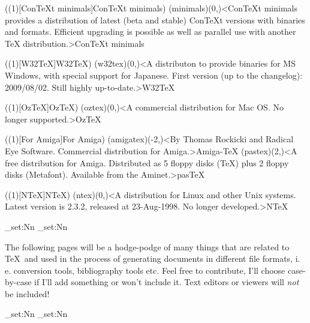 \tograph(\tostruct(1)[Con\TeX t minimals]{Con\TeX t minimals}){
	\tonode(minimals)(0,\layer)<ConTeXt minimals provides a distribution of latest (beta and stable) ConTeXt versions with binaries and formats. Efficient upgrading is possible as well as parallel use with another TeX distribution.>{Con\TeX t minimals}
}

\tograph(\tostruct(1)[W32\TeX]{W32\TeX}){
	\tonode(w32tex)(0,\layer)<A distributon to provide binaries for MS Windows, with special support for Japanese. First version (up to the changelog): 2009/08/02. Still highly up-to-date.>{W32\TeX}
}

\tograph(\tostruct(1)[OzTeX]{OzTeX}){
	\tonode[\histdistro](oztex)(0,\layer)<A commercial distribution for Mac OS. No longer supported.>{Oz\TeX}
}

\tograph(\tostruct(1)[For Amiga]{For Amiga}){
	\tonode[\histdistro](amigatex)(-2,\layer)<By Thomas Rockicki and Radical Eye Software. Commercial distribution for Amiga.>{Amiga-TeX}
	\tonode[\histdistro](pastex)(2,\layer)<A free distribution for Amiga. Distributed as 5 floppy disks (TeX) plus 2 floppy disks (Metafont). Available from the Aminet.>{pasTeX}
}

\tograph(\tostruct(1)[N\TeX]{N\TeX}){
	\tonode[\histdistro](ntex)(0,\layer)<A distribution for Linux and other Unix systems. Latest version is 2.3.2, released at 23-Aug-1998. No longer developed.>{N\TeX}
}

\newpage
\ExplSyntaxOn
  \dim_set:Nn\pdfpagewidth{13cm}       %
  \dim_set:Nn\pdfpageheight{6cm}
\ExplSyntaxOff
\newpage
{}
\parbox{\textwidth}{\normalsize
The following pages will be a hodge-podge of many things that are related to \TeX\ and used in the process of generating documents in different file formats, i.\,e. conversion tools, bibliography tools etc. Feel free to contribute, I'll choose case-by-case if I'll add something or won't include it. Text editors or viewers will \emph{not} be included!
}
  \restoregeometry
\ExplSyntaxOn
  \dim_set:Nn\pdfpagewidth{21cm}     %
  \dim_set:Nn\pdfpageheight{29.7cm}
\ExplSyntaxOff

